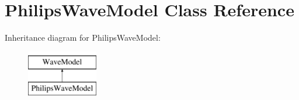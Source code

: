 \hypertarget{classPhilipsWaveModel}{\section{Philips\-Wave\-Model Class Reference}
\label{classPhilipsWaveModel}
}
Inheritance diagram for Philips\-Wave\-Model\-:\begin{figure}[H]
\begin{center}
\leavevmode
\includegraphics[height=2.000000cm]{classPhilipsWaveModel}
\end{center}
\end{figure}
